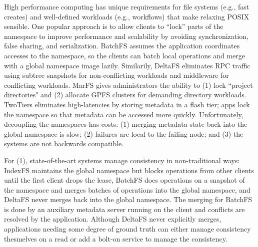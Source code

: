 High performance computing has unique requirements for file systems ({e.g.},
fast creates) and well-defined workloads (e.g., workflows) that make relaxing
POSIX sensible.  One popular approach is to allow clients to ``lock'' parts of
the namespace to improve performance and scalability by avoiding
synchronization, false sharing, and serialization.  BatchFS assumes the
application coordinates accesses to the namespace, so the clients can batch
local operations and merge with a global namespace image lazily. Similarily,
DeltaFS eliminates RPC traffic using subtree snapshots for non-conflicting
workloads and middleware for conflicting workloads. MarFS gives administrators
the ability to (1) lock ``project directories" and (2) allocate GPFS clusters
for demanding directory workloads. TwoTiers eliminates high-latencies by
storing metadata in a flash tier; apps lock the namespace so that metadata can
be accessed more quickly.  Unfortunately, decoupling the namespaces has costs:
(1) merging metadata state back into the global namespace is slow; (2) failures
are local to the failing node; and (3) the systems are not backwards
compatible. 


For (1), state-of-the-art systems manage consistency in non-traditional ways:
IndexFS maintains the global namespace but blocks operations from other clients
until the first client drops the lease, BatchFS does operations on a snapshot
of the namespace and merges batches of operations into the global namespace,
and DeltaFS never merges back into the global namespace. The merging for
BatchFS is done by an auxiliary metadata server running on the client and
conflicts are resolved by the application. Although DeltaFS never explicitly
merges, applications needing some degree of ground truth can either manage
consistency thesmelves on a read or add a bolt-on service to manage the
consistency.

